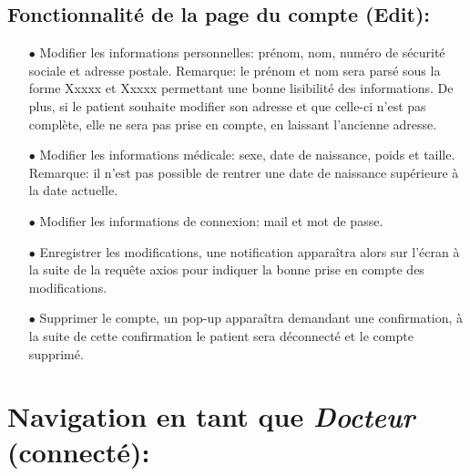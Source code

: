 \documentclass[a4paper]{report}
\begin{document}
\subsection{Fonctionnalité de la page du compte (Edit):}\label{edit}
    \begin{itemize}
        \item[$\bullet$] Modifier les informations personnelles: prénom, nom, numéro de sécurité sociale et adresse postale. {\fontsize{8}{14}\selectfont Remarque: le prénom et nom sera parsé sous la forme Xxxxx et Xxxxx permettant une bonne lisibilité des informations. De plus, si le patient souhaite modifier son adresse et que celle-ci n'est pas complète, elle ne sera pas prise en compte, en laissant l’ancienne adresse.}
        \item[$\bullet$] Modifier les informations médicale: sexe, date de naissance, poids et taille. {\fontsize{8}{14}\selectfont Remarque: il n’est pas possible de rentrer une date de naissance supérieure à la date actuelle}.
        \item[$\bullet$] Modifier les informations de connexion: mail et mot de passe.
        \item[$\bullet$] Enregistrer les modifications, une notification apparaîtra alors sur l'écran à la suite de la requête axios pour indiquer la bonne prise en compte des modifications.
        \item[$\bullet$] Supprimer le compte, un pop-up apparaîtra demandant une confirmation, à la suite de cette confirmation le patient sera déconnecté et le compte supprimé.
    \end{itemize}

\vspace{1.5cm}

\section{{\noindent Navigation en tant que \textit{Docteur} {\fontsize{12}{16}\selectfont(connecté)}: }}
\vspace{0.6cm}
\end{document}
